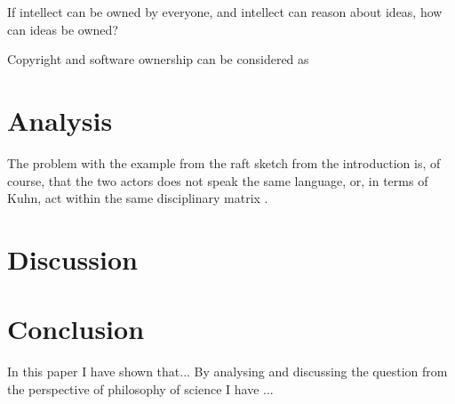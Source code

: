 \documentclass{article}
\begin{document}
If intellect can be owned by everyone, and intellect can reason about ideas, how can ideas be owned? 

Copyright and software ownership can be considered as 

\section{Analysis}
The problem with the example from the raft sketch from the introduction is, of course, that the two actors does not speak the same language, or, in terms of Kuhn, act within the same disciplinary matrix \citep{Holm:2014}.

\section{Discussion}

\section{Conclusion}
In this paper I have shown that...
By analysing and discussing the question from the perspective
of philosophy of science I have ...


\end{document}
